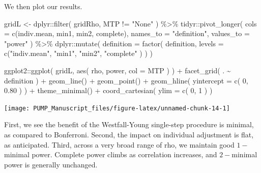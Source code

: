 \documentclass[
]{article}
\newenvironment{Shaded}{\begin{snugshade}}{\end{snugshade}}
\newcommand{\AttributeTok}[1]{\textcolor[rgb]{0.77,0.63,0.00}{#1}}
\newcommand{\DecValTok}[1]{\textcolor[rgb]{0.00,0.00,0.81}{#1}}
\newcommand{\FloatTok}[1]{\textcolor[rgb]{0.00,0.00,0.81}{#1}}
\newcommand{\FunctionTok}[1]{\textcolor[rgb]{0.00,0.00,0.00}{#1}}
\newcommand{\NormalTok}[1]{#1}
\newcommand{\OtherTok}[1]{\textcolor[rgb]{0.56,0.35,0.01}{#1}}
\newcommand{\SpecialCharTok}[1]{\textcolor[rgb]{0.00,0.00,0.00}{#1}}
\newcommand{\StringTok}[1]{\textcolor[rgb]{0.31,0.60,0.02}{#1}}
\begin{document}
We then plot our results.

\begin{Shaded}
\begin{Highlighting}[]
\NormalTok{gridL }\OtherTok{\textless{}{-}}\NormalTok{ dplyr}\SpecialCharTok{::}\FunctionTok{filter}\NormalTok{( gridRho, MTP }\SpecialCharTok{!=} \StringTok{"None"}\NormalTok{ ) }\SpecialCharTok{\%\textgreater{}\%}
\NormalTok{  tidyr}\SpecialCharTok{::}\FunctionTok{pivot\_longer}\NormalTok{( }\AttributeTok{cols =} \FunctionTok{c}\NormalTok{(indiv.mean, min1, min2, complete),}
                         \AttributeTok{names\_to =} \StringTok{"definition"}\NormalTok{, }\AttributeTok{values\_to =} \StringTok{"power"}\NormalTok{ ) }\SpecialCharTok{\%\textgreater{}\%}
\NormalTok{  dplyr}\SpecialCharTok{::}\FunctionTok{mutate}\NormalTok{( }\AttributeTok{definition =} \FunctionTok{factor}\NormalTok{( definition,}
          \AttributeTok{levels =} \FunctionTok{c}\NormalTok{(}\StringTok{"indiv.mean"}\NormalTok{, }\StringTok{"min1"}\NormalTok{, }\StringTok{"min2"}\NormalTok{, }\StringTok{"complete"}\NormalTok{ ) ) )}

\NormalTok{ggplot2}\SpecialCharTok{::}\FunctionTok{ggplot}\NormalTok{( gridL, }\FunctionTok{aes}\NormalTok{( rho, power, }\AttributeTok{col =}\NormalTok{ MTP ) ) }\SpecialCharTok{+}
  \FunctionTok{facet\_grid}\NormalTok{( . }\SpecialCharTok{\textasciitilde{}}\NormalTok{ definition ) }\SpecialCharTok{+}
  \FunctionTok{geom\_line}\NormalTok{() }\SpecialCharTok{+} \FunctionTok{geom\_point}\NormalTok{() }\SpecialCharTok{+}
  \FunctionTok{geom\_hline}\NormalTok{( }\AttributeTok{yintercept =} \FunctionTok{c}\NormalTok{( }\DecValTok{0}\NormalTok{, }\FloatTok{0.80}\NormalTok{ ) ) }\SpecialCharTok{+} 
  \FunctionTok{theme\_minimal}\NormalTok{() }\SpecialCharTok{+}
  \FunctionTok{coord\_cartesian}\NormalTok{( }\AttributeTok{ylim =} \FunctionTok{c}\NormalTok{( }\DecValTok{0}\NormalTok{, }\DecValTok{1}\NormalTok{ ) )}
\end{Highlighting}
\end{Shaded}

\begin{center}\texttt{[image: PUMP\_Manuscript\_files/figure-latex/unnamed-chunk-14-1]} \end{center}

First, we see the benefit of the Westfall-Young single-step procedure is
minimal, as compared to Bonferroni. Second, the impact on individual
adjustment is flat, as anticipated. Third, across a very broad range of
rho, we maintain good \(1-\)minimal power. Complete power climbs as
correlation increases, and \(2-\)minimal power is generally unchanged.
\end{document}
